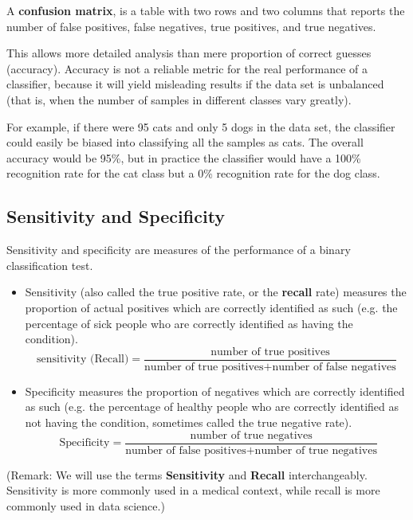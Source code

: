 \documentclass[12pt]{article} %
\begin{document}
A \textbf{confusion matrix}, is a table with two rows and two columns that reports the number of false positives, false negatives, true positives, and true negatives.

This allows more detailed analysis than mere proportion of correct guesses (accuracy). Accuracy is not a reliable metric for the real performance of a classifier, because it will yield misleading results if the data set is unbalanced (that is, when the number of samples in different classes vary greatly).

For example, if there were 95 cats and only 5 dogs in the data set, the classifier could easily be biased into classifying all the samples as cats. The overall accuracy would be 95\%, but  in practice the classifier would have a 100\% recognition rate for the cat class but a 0\% recognition rate for the dog class.


\subsection{Sensitivity and Specificity}

Sensitivity and specificity are measures of the performance of a binary classification test.

\begin{itemize}
\item Sensitivity (also called the true positive rate, or the \textbf{recall} rate) measures the proportion of actual positives which are correctly identified as such (e.g. the percentage of sick people who are correctly identified as having the condition).
    \[ \mbox{sensitivity (Recall)} = \frac{ \mbox{number of true positives} } {\mbox{number of true positives} + \mbox{number of false negatives}} \]

\item Specificity measures the proportion of negatives which are correctly identified as such (e.g. the percentage of healthy people who are correctly identified as not having the condition, sometimes called the true negative rate).
    \[ \mbox{ Specificity} = \frac{ \mbox{number of true negatives} } {\mbox{number of false positives} + \mbox{number of true negatives}} \]

\end{itemize}

(Remark: We will use the terms \textbf{Sensitivity} and \textbf{Recall} interchangeably. Sensitivity is more commonly used in a medical context, while recall is more commonly used in data science.)
\end{document}
